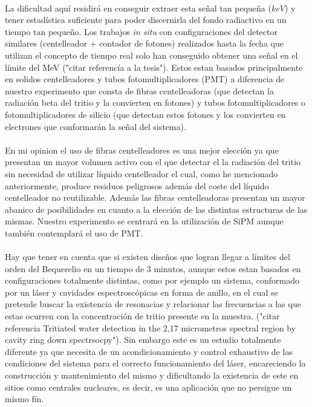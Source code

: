 \paragraph {}
La dificultad aquí residirá en conseguir extraer esta señal tan pequeña ($keV$) y tener estadística suficiente para poder discernirla del fondo radiactivo en un tiempo tan pequeño. Los trabajos \textit{in situ} con configuraciones del detector similares (centelleador + contador de fotones) realizados hasta la fecha que utilizan el concepto de tiempo real solo han conseguido obtener una señal en el límite del MeV ("citar referencía a la tesis"). Estos estan basados principalmente en solidos centelleadores y tubos fotomultiplicadores (PMT) a diferencia de nuestro experimento que consta de fibras centelleadoras (que detectan la radiación beta del tritio y la convierten en fotones) y tubos fotomultiplicadores o fotomultiplicadores de silicio (que detectan estos fotones y los convierten en electrones que conformarán la señal del sistema). 

\paragraph {}
En mi opinion el uso de fibras centelleadores es una mejor elección ya que presentan un mayor volumen activo con el que detectar el la radiación del tritio  sin necesidad de utilizar líquido centelleador el cual, como he mencionado anteriormente, produce residuos peligrosos además del coste del líquido centelleador no reutilizable. Además las fibras centelleadoras presentan un mayor abanico de posibilidades en cuanto a la elección de las distintas estructuras de las mismas. Nuestro experimento se centrará en la utilización de SiPM aunque también contemplará el uso de PMT. 

\paragraph {}
Hay que tener en cuenta que si existen diseños que logran llegar a límites del orden del Bequerelio en un tiempo de 3 minutos, aunque estos estan basados en configuraciones totalmente distintas, como por ejemplo un sistema, conformado por un láser y cavidades espectroscópicas en forma de anillo, en el cual se pretende buscar la existencia de resonacias y relacionar las frecuencias a las que estas ocurren con la concentración de tritio presente en la muestra. ("citar referencia Tritiated water detection in the 2,17 micrometros spectral region by cavity ring down spectrsocpy"). Sin embargo este es un estudio totalmente diferente ya que necesita de un acondicionamiento y control exhaustivo de las condiciones del sistema para el correcto funcionamiento del láser, encareciendo la construcción y mantenimiento del mismo y dificultando la existencia de este en sitios como centrales nucleares, es decir, es una aplicación que no persigue un mismo fín.

